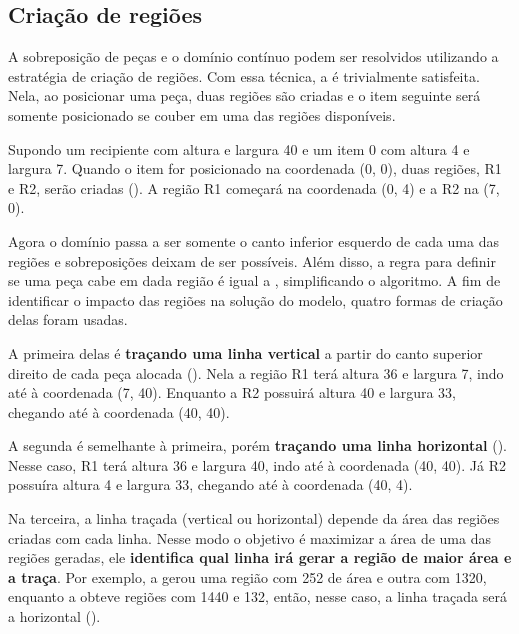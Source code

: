 \subsection{Criação de regiões}\label{subsec:criacao-de-regioes}

A sobreposição de peças e o domínio contínuo podem ser
resolvidos utilizando a estratégia de criação de regiões.
Com essa técnica, a  é trivialmente satisfeita.
Nela, ao posicionar uma peça, duas regiões são criadas e o item
seguinte será somente posicionado se couber em uma das regiões disponíveis.

Supondo um recipiente com altura e largura 40 e um item 0 com altura 4 e largura 7.
Quando o item for posicionado na coordenada (0, 0), duas regiões, R1 e R2, serão criadas
().
A região R1 começará na coordenada (0, 4) e a R2 na (7, 0).



Agora o domínio passa a ser somente o canto inferior esquerdo de cada uma das regiões e
sobreposições deixam de ser possíveis.
Além disso, a regra para definir se uma peça cabe em dada região é igual a ,
simplificando o algoritmo.
A fim de identificar o impacto das regiões na solução do modelo, quatro formas de criação
delas foram usadas.

A primeira delas é \textbf{traçando uma linha vertical} a partir do canto superior direito de cada
peça alocada ().
Nela a região R1 terá altura 36 e largura 7, indo até à coordenada (7, 40).
Enquanto a R2 possuirá altura 40 e largura 33, chegando até à coordenada (40, 40).

A segunda é semelhante à primeira, porém \textbf{traçando uma linha horizontal}
().
Nesse caso, R1 terá altura 36 e largura 40, indo até à coordenada (40, 40).
Já R2 possuíra altura 4 e largura 33, chegando até à coordenada (40, 4).



Na terceira, a linha traçada (vertical ou horizontal) depende da área das regiões criadas
com cada linha.
Nesse modo o objetivo é maximizar a área de uma das regiões geradas, ele \textbf{identifica qual
linha irá gerar a região de maior área e a traça}.
Por exemplo, a  gerou uma região com 252 de área e outra com 1320,
enquanto a  obteve regiões com 1440 e 132, então, nesse caso, a linha
traçada será a horizontal ().

